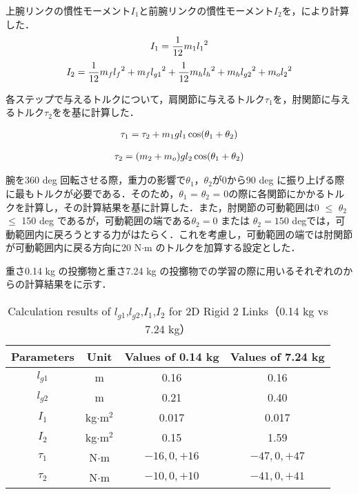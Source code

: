 上腕リンクの慣性モーメント$I_{1}$と前腕リンクの慣性モーメント$I_{2}$を，により計算した．
\begin{eqnarray}
  \equlabel{2.29}
  I_{1}=\frac{1}{12}m_{1}{l_{1}}^{2}
\end{eqnarray}
\begin{eqnarray}
  \equlabel{2.30}
  I_{2}=\frac{1}{12}m_{f}{l_{f}}^{2}+m_{f}{l_{g1}}^{2}+\frac{1}{12}m_{h}{l_{h}}^{2}+m_{h}{l_{g2}}^{2}+m_{o}{l_{2}}^{2}
\end{eqnarray}

各ステップで与えるトルクについて，肩関節に与えるトルク$\tau_{1}$を，肘関節に与えるトルク$\tau_{2}$をを基に計算した．

\begin{eqnarray}
  \equlabel{2.31}
  \tau_{1} = \tau_{2} + m_{1}gl_{1}\cos(\theta_{1} + \theta_{2})
\end{eqnarray}

\begin{eqnarray}
  \equlabel{2.32}
  \tau_{2} = (m_{2} + m_{o})gl_{2}\cos(\theta_{1} + \theta_{2})
\end{eqnarray}

腕を360 deg 回転させる際，重力の影響で$\theta_{1}$，$\theta_{2}$が0から90 deg に振り上げる際に最もトルクが必要である．そのため，$\theta_{1}$ = $\theta_{2}$ = 0の際に各関節にかかるトルクを計算し，その計算結果を基に計算した．また，肘関節の可動範囲は0 $\le$ $\theta_{2}$ $\le$ 150 deg であるが，可動範囲の端である$\theta_{2} = 0$ または $\theta_{2} = 150$ degでは，可動範囲内に戻ろうとする力がはたらく．これを考慮し，可動範囲の端では肘関節が可動範囲内に戻る方向に20 N$\cdot$m のトルクを加算する設定とした．

重さ0.14 kg の投擲物と重さ7.24 kg の投擲物での学習の際に用いるそれぞれのからの計算結果をに示す．

\begin{table}[tb]
  \begin{center}
    \caption{Calculation results of $l_{g1}$,$l_{g2}$,$I_{1}$,$I_{2}$ for 2D Rigid 2 Links（0.14 kg vs 7.24 kg）}
    \begin{tabular}{c|c|c|c}
      \hline
      Parameters & Unit & Values of 0.14 kg & Values of 7.24 kg \\
      \hline
      $l_{g1}$ & m & 0.16 & 0.16 \\
      $l_{g2}$ & m & 0.21 & 0.40 \\
      $I_{1}$ & kg$\cdot$$\mathrm{m}^2$ & 0.017 & 0.017 \\
      $I_{2}$ & kg$\cdot$$\mathrm{m}^2$ & 0.15 & 1.59 \\
      $\tau_{1}$ & N$\cdot$m & $-16, 0, +16$ & $-47, 0, +47 $\\
      $\tau_{2}$ & N$\cdot$m & $-10, 0, +10$ & $-41, 0, +41 $\\
      \hline
    \end{tabular}
  \end{center}
\end{table}


